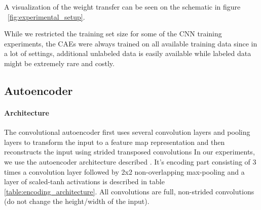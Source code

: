 \documentclass{article}
\begin{document}
  A visualization of the weight transfer can be seen on the schematic in figure ~\ref{fig:experimental_setup}. 

  While we restricted the training set size for some of the CNN training experiments, the CAEs were always trained on all available training data since in a lot of settings, additional unlabeled data is easily available while labeled data might be extremely rare and costly.  

  \subsection{Autoencoder}

    \paragraph{Architecture}
    The convolutional autoencoder first uses several convolution layers and pooling layers to transform the input to a feature map representation and then reconstructs the input using strided transposed convolutions 
    In our experiments, we use the autoencoder architecture described \citep{TODO:add_stacked_conv_citation}. It's encoding part consisting of 3 times a convolution layer followed by 2x2 non-overlapping max-pooling and a layer of scaled-tanh activations is described in table \ref{table:encoding_architecture}. All convolutions are full, non-strided convolutions (do not change the height/width of the input). 

    \begin{table}[h]

      \centering

        
      \caption{CAE/CNN: shared encoding layers. Channels refers to the amount of feature maps in the given layer}
      \label{table:encoding_architecture}

    \end{table}
\end{document}
